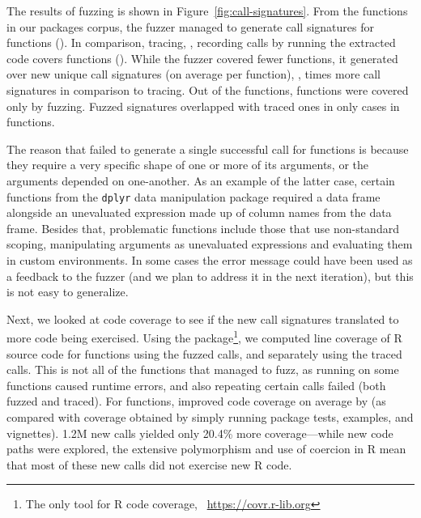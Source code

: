 \documentclass[sigplan,screen]{acmart}
\begin{document}
The results of fuzzing is shown in Figure~\ref{fig:call-signatures}.
From the \UFNumFunctions functions in our \UFNumPackages packages corpus, the fuzzer managed to generate call signatures for \UFNumFunctionsSignatrSignature functions (\UFNumFunctionsSignatrToCorpusSignatureRatio).
In comparison, tracing, \Ie, recording calls by running the extracted code covers \UFNumFunctionsBaselineSignature functions (\UFNumFunctionsBaselineToCorpusSignatureRatio).
While the fuzzer covered fewer functions, it generated over \UFSignatrSignaturesRnd new unique call signatures (on average \UFAvgNewSignatrSignature per function), \Ie, \UFSignatrBaselineSignaturesRatio times more call signatures in comparison to tracing.
Out of the \UFNumFunctionsSignatrSignature functions, \UFNumFunctionsOnlySignatrSignature functions were covered only by fuzzing.
Fuzzed signatures overlapped with traced ones in only \UFSharedSignatures cases in \UFSharedSignatuesFunctions functions.

The reason that \tool failed to generate a single successful call for \UFNumMissingFunctionSignatr functions is because they require a very specific shape of one or more of its arguments, or the arguments depended on one-another.
As an example of the latter case, certain functions from the {\tt dplyr} data manipulation package required a data frame alongside an unevaluated expression made up of column names from the data frame. 
Besides that, problematic functions include those that use non-standard scoping, manipulating arguments as unevaluated expressions and evaluating them in custom environments.
In some cases the error message could have been used as a feedback to the fuzzer (and we plan to address it in the next iteration), but this is not easy to generalize.

Next, we looked at code coverage to see if the new call signatures translated to more code being exercised. 
Using the  package\footnote{The only tool for R code coverage, \Cf~\url{https://covr.r-lib.org}}, we computed line coverage of R source code for \UFNumFunctionsWithBothCoverage functions using the fuzzed calls, and separately using the traced calls.
This is not all of the functions that \tool managed to fuzz, as running  on some functions caused runtime errors, and also repeating certain calls failed (both fuzzed and traced).
For \UFBetterCoverage functions, \tool improved code coverage on average by \UFBetterCoverageMean (as compared with coverage obtained by simply running package tests, examples, and vignettes).
1.2M new calls yielded only 20.4\% more coverage---while new code paths were explored, the extensive polymorphism and use of coercion in R mean that most of these new calls did not exercise new R code.
\end{document}
